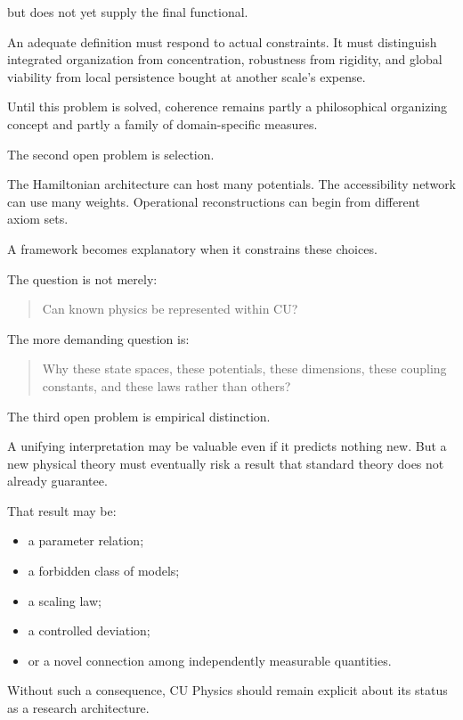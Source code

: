 \documentclass[
  11pt,
]{article}
\providecommand{\tightlist}{%
  \setlength{\itemsep}{0pt}\setlength{\parskip}{0pt}}
\begin{document}
but does not yet supply the final functional.

An adequate definition must respond to actual constraints. It must
distinguish integrated organization from concentration, robustness from
rigidity, and global viability from local persistence bought at another
scale's expense.

Until this problem is solved, coherence remains partly a philosophical
organizing concept and partly a family of domain-specific measures.

The second open problem is selection.

The Hamiltonian architecture can host many potentials. The accessibility
network can use many weights. Operational reconstructions can begin from
different axiom sets.

A framework becomes explanatory when it constrains these choices.

The question is not merely:

\begin{quote}
Can known physics be represented within CU?
\end{quote}

The more demanding question is:

\begin{quote}
Why these state spaces, these potentials, these dimensions, these
coupling constants, and these laws rather than others?
\end{quote}

The third open problem is empirical distinction.

A unifying interpretation may be valuable even if it predicts nothing
new. But a new physical theory must eventually risk a result that
standard theory does not already guarantee.

That result may be:

\begin{itemize}
\tightlist
\item
  a parameter relation;
\item
  a forbidden class of models;
\item
  a scaling law;
\item
  a controlled deviation;
\item
  or a novel connection among independently measurable quantities.
\end{itemize}

Without such a consequence, CU Physics should remain explicit about its
status as a research architecture.
\end{document}

